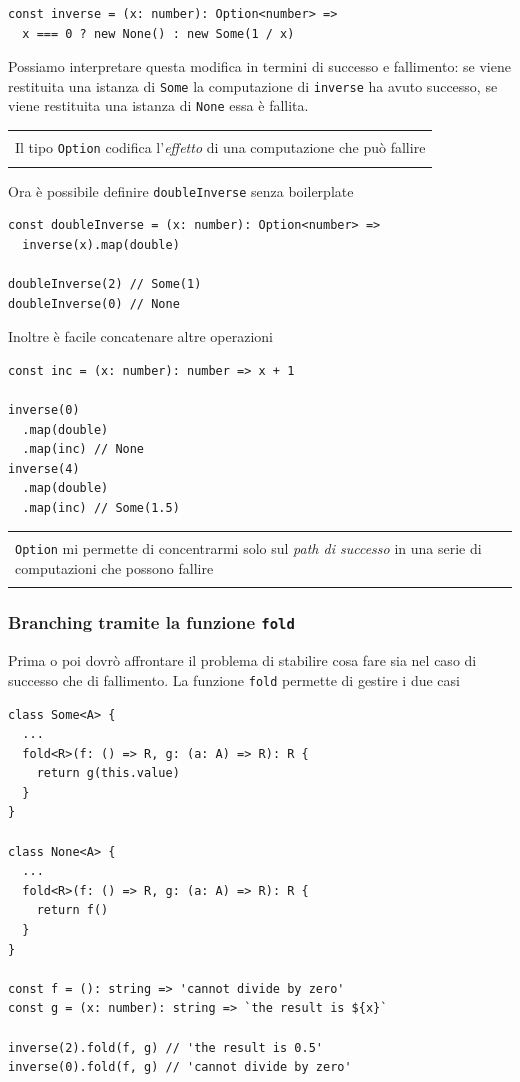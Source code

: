 \documentclass[12pt]{article}
\newenvironment{boxed}
    {\begin{center}
    \begin{tabular}{|p{0.9\textwidth}|}
    \hline\\
    }
    {
    \\\\\hline
    \end{tabular}
    \end{center}
    }
\begin{document}
\begin{verbatim}
const inverse = (x: number): Option<number> =>
  x === 0 ? new None() : new Some(1 / x)
\end{verbatim}

Possiamo interpretare questa modifica in termini di successo e fallimento: se viene restituita una istanza di \texttt{Some}
la computazione di \texttt{inverse} ha avuto successo, se viene restituita una istanza di \texttt{None} essa è fallita.

\begin{boxed}
Il tipo \texttt{Option} codifica l'\emph{effetto} di una computazione che può fallire
\end{boxed}

Ora è possibile definire \texttt{doubleInverse} senza boilerplate

\begin{verbatim}
const doubleInverse = (x: number): Option<number> =>
  inverse(x).map(double)

doubleInverse(2) // Some(1)
doubleInverse(0) // None
\end{verbatim}

Inoltre è facile concatenare altre operazioni

\begin{verbatim}
const inc = (x: number): number => x + 1

inverse(0)
  .map(double)
  .map(inc) // None
inverse(4)
  .map(double)
  .map(inc) // Some(1.5)
\end{verbatim}

\begin{boxed}
\texttt{Option} mi permette di concentrarmi solo sul \emph{path di successo} in una serie di computazioni che possono fallire
\end{boxed}

\subsubsection{Branching tramite la funzione \texttt{fold}}

Prima o poi dovrò affrontare il problema di stabilire cosa fare sia nel caso di successo che di fallimento.
La funzione \texttt{fold} permette di gestire i due casi

\begin{verbatim}
class Some<A> {
  ...
  fold<R>(f: () => R, g: (a: A) => R): R {
    return g(this.value)
  }
}

class None<A> {
  ...
  fold<R>(f: () => R, g: (a: A) => R): R {
    return f()
  }
}

const f = (): string => 'cannot divide by zero'
const g = (x: number): string => `the result is ${x}`

inverse(2).fold(f, g) // 'the result is 0.5'
inverse(0).fold(f, g) // 'cannot divide by zero'
\end{verbatim}
\end{document}
